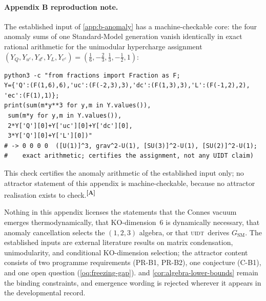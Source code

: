 \documentclass[12pt,a4paper,twoside]{article}
\theoremstyle{plain}
\theoremstyle{definition}
\theoremstyle{remark}
\newcommand{\UIDT}{\textsc{uidt}}
\newcommand{\catmark}[1]{\textsuperscript{\textsf{\textbf{[#1]}}}}
\begin{document}
\paragraph{Appendix B reproduction note.}
The established input of \cref{app:b-anomaly} has a machine-checkable
core: the four anomaly sums of one Standard-Model generation vanish
identically in exact rational arithmetic for the unimodular hypercharge
assignment
$(Y_Q,Y_{u^c},Y_{d^c},Y_L,Y_{e^c})=(\tfrac{1}{6},-\tfrac{2}{3},\tfrac{1}{3},-\tfrac{1}{2},1)$:
\begin{verbatim}
python3 -c "from fractions import Fraction as F;
Y={'Q':(F(1,6),6),'uc':(F(-2,3),3),'dc':(F(1,3),3),'L':(F(-1,2),2),
'ec':(F(1),1)};
print(sum(m*y**3 for y,m in Y.values()),
 sum(m*y for y,m in Y.values()),
 2*Y['Q'][0]+Y['uc'][0]+Y['dc'][0],
 3*Y['Q'][0]+Y['L'][0])"
# -> 0 0 0 0  ([U(1)]^3, grav^2-U(1), [SU(3)]^2-U(1), [SU(2)]^2-U(1);
#    exact arithmetic; certifies the assignment, not any UIDT claim)
\end{verbatim}
This check certifies the anomaly arithmetic of the established input only;
no attractor statement of this appendix is machine-checkable, because no
attractor realisation exists to check.\catmark{A}

\begin{governancebox}
Nothing in this appendix licenses the statements that the Connes vacuum
emerges thermodynamically, that KO-dimension~6 is dynamically necessary,
that anomaly cancellation selects the $(1,2,3)$ algebra, or that \UIDT\
derives $G_{\mathrm{SM}}$. The established inputs are external literature
results on matrix condensation, unimodularity, and conditional
KO-dimension selection; the attractor content consists of two programme
requirements (PR-B1, PR-B2), one conjecture (C-B1), and one open question
(\cref{oq:freezing-gap}). \Cref{thm:gap-localisation} and
\cref{cor:algebra-lower-bounds} remain the binding constraints, and
emergence wording is rejected wherever it appears in the developmental
record.
\end{governancebox}
\end{document}
